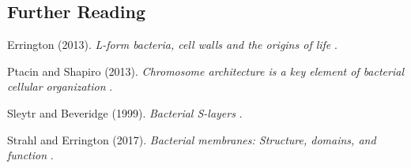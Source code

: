 \documentclass[]{tufte-book}
\begin{document}
\subsection*{Further Reading}\label{further-reading}

Errington (2013). \emph{L-form bacteria, cell walls and the origins of
life} \citep{errington2013}.

Ptacin and Shapiro (2013). \emph{Chromosome architecture is a key
element of bacterial cellular organization} \citep{ptacin2013}.

Sleytr and Beveridge (1999). \emph{Bacterial S-layers}
\citep{sleytr1999}.

Strahl and Errington (2017). \emph{Bacterial membranes: Structure,
domains, and function} \citep{strahl2017}.


\end{document}
